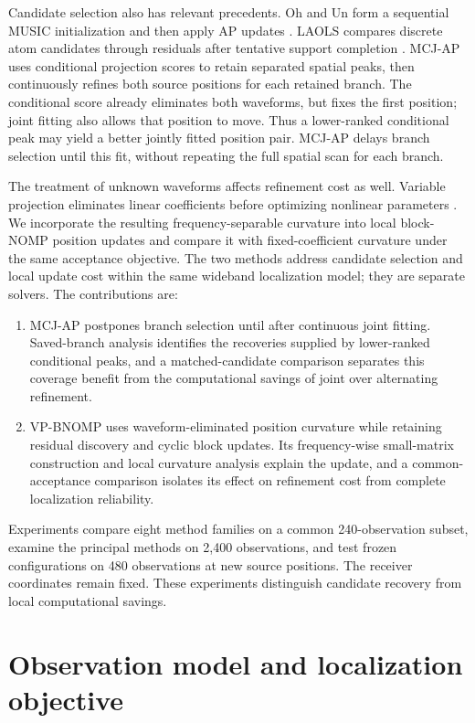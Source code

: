 \documentclass[a4paper,fleqn,review]{cas-sc}
\begin{document}
Candidate selection also has relevant precedents. Oh and Un form a sequential MUSIC initialization and then apply AP updates \cite{OhUn1991}. LAOLS compares discrete atom candidates through residuals after tentative support completion \cite{Chatterjee2012}. MCJ-AP uses conditional projection scores to retain separated spatial peaks, then continuously refines both source positions for each retained branch. The conditional score already eliminates both waveforms, but fixes the first position; joint fitting also allows that position to move. Thus a lower-ranked conditional peak may yield a better jointly fitted position pair. MCJ-AP delays branch selection until this fit, without repeating the full spatial scan for each branch.

The treatment of unknown waveforms affects refinement cost as well. Variable projection eliminates linear coefficients before optimizing nonlinear parameters \cite{GolubPereyra1973}. We incorporate the resulting frequency-separable curvature into local block-NOMP position updates and compare it with fixed-coefficient curvature under the same acceptance objective. The two methods address candidate selection and local update cost within the same wideband localization model; they are separate solvers. The contributions are:
\begin{enumerate}
\item MCJ-AP postpones branch selection until after continuous joint fitting. Saved-branch analysis identifies the recoveries supplied by lower-ranked conditional peaks, and a matched-candidate comparison separates this coverage benefit from the computational savings of joint over alternating refinement.
\item VP-BNOMP uses waveform-eliminated position curvature while retaining residual discovery and cyclic block updates. Its frequency-wise small-matrix construction and local curvature analysis explain the update, and a common-acceptance comparison isolates its effect on refinement cost from complete localization reliability.
\end{enumerate}
Experiments compare eight method families on a common 240-observation subset, examine the principal methods on 2,400 observations, and test frozen configurations on 480 observations at new source positions. The receiver coordinates remain fixed. These experiments distinguish candidate recovery from local computational savings.

\FloatBarrier
\section{Observation model and localization objective}
\FloatBarrier
\end{document}
